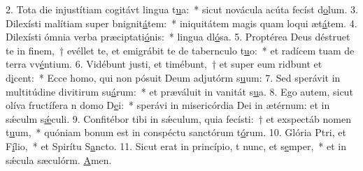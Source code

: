 2. Tota die injustítiam cogitávt lingua t\uline{u}a:~* sicut novácula acúta fecíst d\uline{o}lum.
3. Dilexísti malítiam super bnignit\uline{á}tem:~* iniquitátem magis quam loqui æt\uline{á}tem.
4. Dilexísti ómnia verba præciptati\uline{ó}nis:~* lingua dl\uline{ó}sa.
5. Proptérea Deus déstruet te in finem,~† evéllet te, et emigrábit te de tabernculo t\uline{u}o:~* et radícem tuam de terra vv\uline{é}ntium.
6. Vidébunt justi, et timébunt,~† et super eum ridbunt et d\uline{i}cent:~* Ecce homo, qui non pósuit Deum adjutórm s\uline{u}um:
7. Sed sperávit in multitúdine divitirum su\uline{á}rum:~* et præváluit in vanitát s\uline{u}a.
8. Ego autem, sicut olíva fructífera n domo D\uline{e}i:~* sperávi in misericórdia Dei in ætérnum: et in sǽculm s\uline{ǽ}culi.
9. Confitébor tibi in sǽculum, quia fecísti:~† et exspectáb nomen t\uline{u}um,~* quóniam bonum est in conspéctu sanctórum t\uline{ó}rum.
10. Glória Ptri, et F\uline{í}lio,~* et Spirítu S\uline{a}ncto.
11. Sicut erat in princípio, t nunc, et s\uline{e}mper,~* et in sǽcula sæculórm. \uline{A}men.
